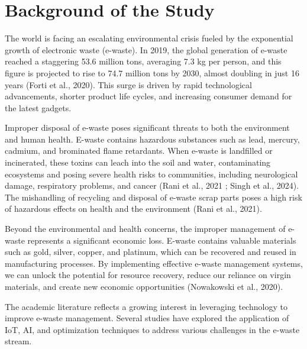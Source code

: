 \section{Background of the Study}

The world is facing an escalating environmental crisis fueled by the exponential growth of electronic waste (e-waste). In 2019, the global generation of e-waste reached a staggering 53.6 million tons, averaging 7.3 kg per person, and this figure is projected to rise to 74.7 million tons by 2030, almost doubling in just 16 years (Forti et al., 2020). This surge is driven by rapid technological advancements, shorter product life cycles, and increasing consumer demand for the latest gadgets.

Improper disposal of e-waste poses significant threats to both the environment and human health. E-waste contains hazardous substances such as lead, mercury, cadmium, and brominated flame retardants. When e-waste is landfilled or incinerated, these toxins can leach into the soil and water, contaminating ecosystems and posing severe health risks to communities, including neurological damage, respiratory problems, and cancer (Rani et al., 2021 ; Singh et al., 2024). The mishandling of recycling and disposal of e-waste scrap parts poses a high risk of hazardous effects on health and the environment (Rani et al., 2021).

Beyond the environmental and health concerns, the improper management of e-waste represents a significant economic loss. E-waste contains valuable materials such as gold, silver, copper, and platinum, which can be recovered and reused in manufacturing processes. By implementing effective e-waste management systems, we can unlock the potential for resource recovery, reduce our reliance on virgin materials, and create new economic opportunities (Nowakowski et al., 2020).

The academic literature reflects a growing interest in leveraging technology to improve e-waste management. Several studies have explored the application of IoT, AI, and optimization techniques to address various challenges in the e-waste stream.

